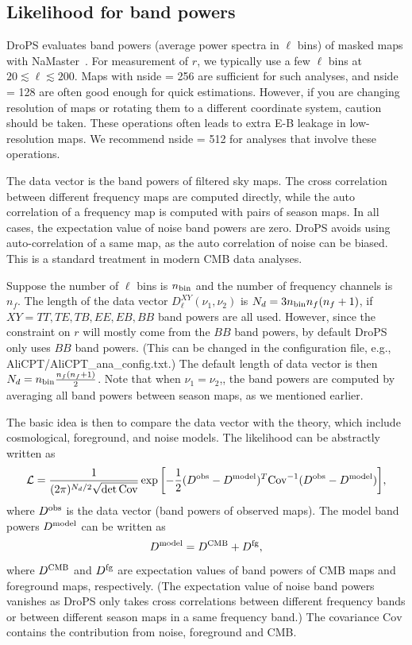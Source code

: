 \documentclass[12pt, a4paper]{ctexart} %
\begin{document}
\subsection{Likelihood for band powers~\label{sec:bandpower_like}}

DroPS evaluates band powers (average power spectra in $\ell$ bins) of masked maps with NaMaster~\cite{NaMaster}. For measurement of $r$, we typically use a few $\ell$ bins at $20\lesssim \ell \lesssim 200$. Maps with nside = 256 are sufficient for such analyses, and nside = 128 are often good enough for quick estimations. However, if you are changing resolution of maps or rotating them to a different coordinate system, caution should be taken. These operations often leads to extra E-B leakage in low-resolution maps. We recommend nside = 512 for analyses that involve these operations.

The data vector is the band powers of filtered sky maps. The cross correlation between different frequency maps are computed directly, while the auto correlation of a frequency map is computed with pairs of season maps. In all cases, the expectation value of noise band powers are zero. DroPS avoids using auto-correlation of a same map, as the auto correlation of noise can be biased. This is a standard treatment in modern CMB data analyses. 

Suppose the number of $\ell$ bins is $n_{\rm bin}$ and the number of frequency channels is $n_f$. The length of the data vector $D^{XY}_\ell(\nu_1,\nu_2)$ is $N_d=3 n_{\rm bin} n_f(n_f+1)$, if $XY = TT, TE, TB, EE, EB, BB$ band powers are all used. However, since the constraint on $r$ will mostly come from the $BB$ band powers, by default DroPS only uses $BB$ band powers. (This can be changed in the configuration file, e.g., AliCPT/AliCPT\_ana\_config.txt.) The default length of data vector is then $N_d = n_{\rm bin}\frac{n_f(n_f+1)}{2}$.  Note that when $\nu_1=\nu_2$,, the band powers are computed by averaging all band powers between season maps,  as we mentioned earlier.

The basic idea is then to compare the data vector with the theory, which include cosmological, foreground, and noise models. The likelihood can be abstractly written as
\begin{equation}
  \mathcal{L} = \frac{1}{(2\pi)^{N_d/2}\sqrt{\det\mathrm{Cov}}} \exp{\left[-\frac{1}{2}(D^{\rm obs} - D^{\rm model})^T\mathrm{Cov}^{-1}(D^{\rm obs} - D^{\rm model})\right]},
\end{equation}
where $D^{\rm obs}$ is the data vector (band powers of observed maps). The model band powers $D^{\rm model}$ can be written as
\begin{equation}
  D^{\rm model} = D^{\rm CMB} + D^{\rm fg},
\end{equation}
where $D^{\rm CMB}$ and $D^{\rm fg}$ are expectation values of band powers of CMB maps and foreground maps, respectively. (The expectation value of noise band powers vanishes as DroPS only takes cross correlations between different frequency bands or between different season maps in a same frequency band.) The covariance $\mathrm{Cov}$ contains the contribution from noise, foreground and CMB. 
\end{document}
